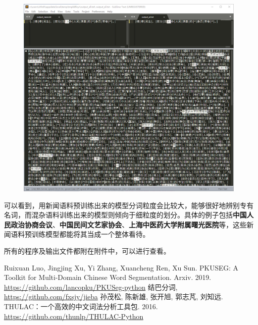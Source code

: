 \documentclass[logo,reportComp]{thesis}
\begin{document}
\begin{itemize}
\begin{figure}[H]
\centering
\includegraphics[width=\linewidth]{compare2.png}
\end{figure}
	可以看到，用新闻语料预训练出来的模型分词粒度会比较大，能够很好地辨别专有名词，而混杂语料训练出来的模型则倾向于细粒度的划分。具体的例子包括\textbf{中国人民政治协商会议}、\textbf{中国民间文艺家协会}、\textbf{上海中医药大学附属曙光医院}等，这些新闻语料预训练模型都能将其当成一个整体看待。
\end{itemize}

所有的程序及输出文件都附在附件中，可以进行查看。

\begin{thebibliography}{99}
 Ruixuan Luo, Jingjing Xu, Yi Zhang, Xuancheng Ren, Xu Sun. PKUSEG: A Toolkit for Multi-Domain Chinese Word Segmentation. Arxiv. 2019. \url{https://github.com/lancopku/PKUSeg-python}
 结巴分词, \url{https://github.com/fxsjy/jieba}
 孙茂松, 陈新雄, 张开旭, 郭志芃, 刘知远. THULAC：一个高效的中文词法分析工具包. 2016. \url{https://github.com/thunlp/THULAC-Python}
\end{thebibliography}
\end{document}

